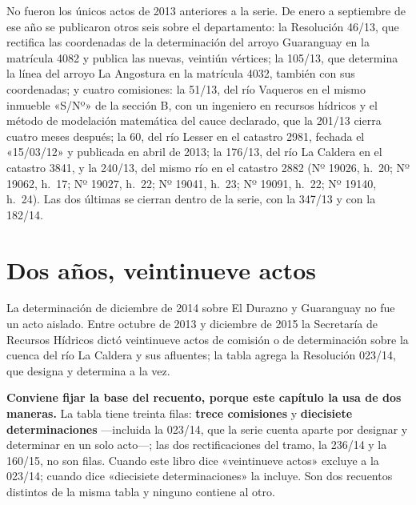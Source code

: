 No fueron los únicos actos de 2013 anteriores a la serie. De enero a septiembre de ese año se publicaron otros seis sobre el departamento: la Resolución 46/13, que rectifica las coordenadas de la determinación del arroyo Guaranguay en la matrícula 4082 y publica las nuevas, veintiún vértices; la 105/13, que determina la línea del arroyo La Angostura en la matrícula 4032, también con sus coordenadas; y cuatro comisiones: la 51/13, del río Vaqueros en el mismo inmueble «S/Nº» de la sección B, con un ingeniero en recursos hídricos y el método de modelación matemática del cauce declarado, que la 201/13 cierra cuatro meses después; la 60, del río Lesser en el catastro 2981, fechada el «15/03/12» y publicada en abril de 2013; la 176/13, del río La Caldera en el catastro 3841, y la 240/13, del mismo río en el catastro 2882 (Nº 19026, h.\ 20; Nº 19062, h.\ 17; Nº 19027, h.\ 22; Nº 19041, h.\ 23; Nº 19091, h.\ 22; Nº 19140, h.\ 24). Las dos últimas se cierran dentro de la serie, con la 347/13 y con la 182/14.

\section{Dos años, veintinueve actos}

La determinación de diciembre de 2014 sobre El Durazno y Guaranguay no fue un acto aislado. Entre octubre de 2013 y diciembre de 2015 la Secretaría de Recursos Hídricos dictó veintinueve actos de comisión o de determinación sobre la cuenca del río La Caldera y sus afluentes; la tabla agrega la Resolución 023/14, que designa y determina a la vez.

\textbf{Conviene fijar la base del recuento, porque este capítulo la usa de dos maneras.} La tabla tiene treinta filas: \textbf{trece comisiones} y \textbf{diecisiete determinaciones} ---incluida la 023/14, que la serie cuenta aparte por designar y determinar en un solo acto---; las dos rectificaciones del tramo, la 236/14 y la 160/15, no son filas. Cuando este libro dice «veintinueve actos» excluye a la 023/14; cuando dice «diecisiete determinaciones» la incluye. Son dos recuentos distintos de la misma tabla y ninguno contiene al otro.

